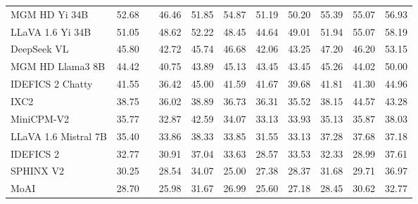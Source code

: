 \begin{table}[h]
{\begin{tabular}{lalcccccccc@{}}
MGM HD Yi 34B \cite{li2024minigemini} & 52.68 &  & 46.46 & 51.85 & 54.87 & 51.19 & 50.20 & 55.39 & 55.07 & 56.93 \\
LLaVA 1.6 Yi 34B \cite{liu2024llavanext} & 51.05 &  & 48.62 & 52.22 & 48.45 & 44.64 & 49.01 & 51.94 & 55.07 & 58.19 \\
DeepSeek VL \cite{lu2024deepseekvl} & 45.80 &  & 42.72 & 45.74 & 46.68 & 42.06 & 43.25 & 47.20 & 46.20 & 53.15 \\
MGM HD Llama3 8B \cite{li2024minigemini} & 44.42 &  & 40.75 & 43.89 & 45.13 & 43.45 & 43.45 & 45.26 & 44.02 & 50.00 \\
IDEFICS 2 Chatty \cite{laurenccon2024matters} & 41.55 &  & 36.42 & 45.00 & 41.59 & 41.67 & 39.68 & 41.81 & 41.30 & 44.96 \\
IXC2 \cite{chen2023internvl} & 38.75 &  & 36.02 & 38.89 & 36.73 & 36.31 & 35.52 & 38.15 & 44.57 & 43.28 \\
MiniCPM-V2 \cite{viscpm} & 35.77 &  & 32.87 & 42.59 & 34.07 & 33.13 & 33.93 & 35.13 & 35.87 & 38.03 \\
LLaVA 1.6 Mistral 7B \cite{liu2024llavanext} & 35.40 &  & 33.86 & 38.33 & 33.85 & 31.55 & 33.13 & 37.28 & 37.68 & 37.18 \\
IDEFICS 2 \cite{laurenccon2024matters} & 32.77 &  & 30.91 & 37.04 & 33.63 & 28.57 & 33.53 & 32.33 & 28.99 & 37.61 \\
SPHINX V2 \cite{gao2024sphinxx} & 30.25 &  & 28.54 & 34.07 & 25.00 & 27.38 & 28.37 & 31.68 & 29.71 & 36.97 \\
MoAI \cite{lee2024moai} & 28.70 &  & 25.98 & 31.67 & 26.99 & 25.60 & 27.18 & 28.45 & 30.62 & 32.77 \\
    \bottomrule
    \hline
    
  \end{tabular}
  }
  \label{tab:val_desc_set_subject}
\vspace{-2ex}
\end{table}


